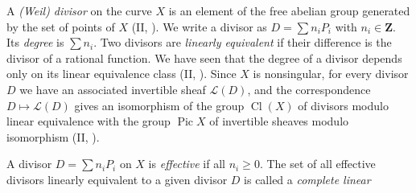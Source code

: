 {\medskip
A \emph{(Weil) divisor} on the curve $X$ is an element of the free abelian group generated by the set of points of $X$ (II, ). We write a divisor as $D=\sum n_iP_i$ with $n_i\in\mathbf Z$. Its \emph{degree} is $\sum n_i$. Two divisors are \emph{linearly equivalent} if their difference is the divisor of a rational function. We have seen that the degree of a divisor depends only on its linear equivalence class (II, ). Since $X$ is nonsingular, for every divisor $D$ we have an associated invertible sheaf $\mathcal L(D)$, and the correspondence $D\mapsto\mathcal L(D)$ gives an isomorphism of the group $\operatorname{Cl}(X)$ of divisors modulo linear equivalence with the group $\operatorname{Pic}X$ of invertible sheaves modulo isomorphism (II, ).

A divisor $D=\sum n_iP_i$ on $X$ is \emph{effective} if all $n_i\geq0$. The set of all effective divisors linearly equivalent to a given divisor $D$ is called a \emph{complete linear}
}
